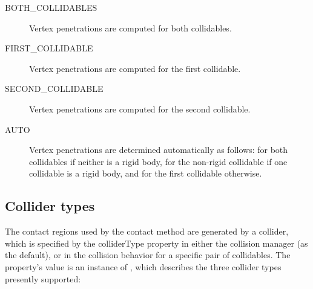 \begin{description}

\item[BOTH\_COLLIDABLES]\mbox{}

Vertex penetrations are computed for both collidables.

\item[FIRST\_COLLIDABLE]\mbox{}

Vertex penetrations are computed for the first collidable.

\item[SECOND\_COLLIDABLE]\mbox{}

Vertex penetrations are computed for the second collidable.

\item[AUTO]\mbox{}

Vertex penetrations are determined automatically as follows: for both
collidables if neither is a rigid body, for the non-rigid collidable
if one collidable is a rigid body, and for the first collidable
otherwise.

\end{description}

\subsection{Collider types}
\label{ColliderTypes:sec}

The contact regions used by the contact method are generated by
a collider, which is specified by the {\sf colliderType} property in
either the collision manager (as the default), or in the collision
behavior for a specific pair of collidables. The property's value is an
instance of
,
which describes the three collider types presently supported:

